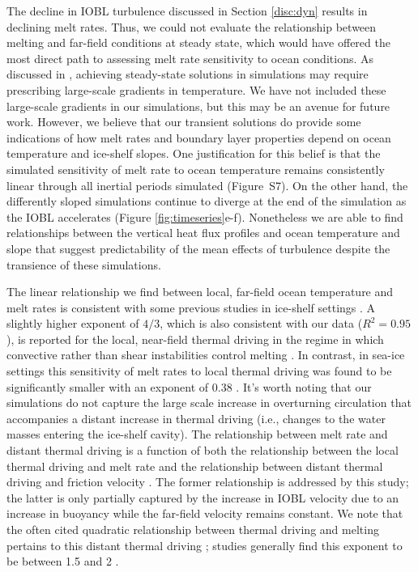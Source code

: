 \documentclass[draft]{styles/agujournal2019}
\begin{document}
The decline in IOBL turbulence discussed in Section \ref{disc:dyn} results in declining melt rates. Thus, we could not evaluate the relationship between melting and far-field conditions at steady state, which would have offered the most direct path to assessing melt rate sensitivity to ocean conditions. As discussed in , achieving steady-state solutions in simulations may require prescribing large-scale gradients in temperature. We have not included these large-scale gradients in our simulations, but this may be an avenue for future work. However, we believe that our transient solutions do provide some indications of how melt rates and boundary layer properties depend on ocean temperature and ice-shelf slopes. One justification for this belief is that the simulated sensitivity of melt rate to ocean temperature remains consistently linear through all inertial periods simulated (Figure~S7). On the other hand, the differently sloped simulations continue to diverge at the end of the simulation as the IOBL accelerates (Figure \ref{fig:timeseries}e-f). Nonetheless we are able to find relationships between the vertical heat flux profiles and ocean temperature and slope that suggest predictability of the mean effects of turbulence despite the transience of these simulations.

The linear relationship we find between local, far-field ocean temperature and melt rates is consistent with some previous studies in ice-shelf settings \cite{rignot_rapid_2002, holland_response_2008, vreugdenhil_stratification_2019}. A slightly higher exponent of $4/3$, which is also consistent with our data ($R^2=0.95$), is reported for the local, near-field thermal driving in the regime in which convective rather than shear instabilities control melting \cite{kerr_dissolution_2015}. In contrast, in sea-ice settings this sensitivity of melt rates to local thermal driving was found to be significantly smaller with an exponent of 0.38 \cite{ramudu_large_2018}. It's worth noting that our simulations do not capture the large scale increase in overturning circulation that accompanies a distant increase in thermal driving (i.e., changes to the water masses entering the ice-shelf cavity). The relationship between melt rate and distant thermal driving is a function of both the relationship between the local thermal driving and melt rate and the relationship between distant thermal driving and friction velocity \cite{holland_response_2008}. The former relationship is addressed by this study; the latter is only partially captured by the increase in IOBL velocity due to an increase in buoyancy while the far-field velocity remains constant. We note that the often cited quadratic relationship between thermal driving and melting pertains to this distant thermal driving  \cite{holland_response_2008}; studies generally find this exponent to be between 1.5 and 2 \cite{little_how_2009, jourdain_ocean_2017, favier_assessment_2019}. 
\end{document}
